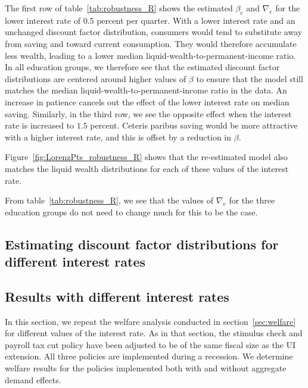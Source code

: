 \documentclass[\latexroot/\projectname]{subfiles}
\begin{document}
The first row of table~\ref{tab:robustness_R} shows the estimated $\beta_e$ and $\nabla_e$ for the lower interest rate of $0.5$ percent per quarter.
With a lower interest rate and an unchanged discount factor distribution, consumers would tend to substitute away from saving and toward current consumption.
They would therefore accumulate less wealth, leading to a lower median liquid-wealth-to-permanent-income ratio.
In all education groups, we therefore see that the estimated discount factor distributions are centered around higher values of $\beta$ to ensure that the model still matches the median liquid-wealth-to-permanent-income ratio in the data.
An increase in patience cancels out the effect of the lower interest rate on median saving.
Similarly, in the third row, we see the opposite effect when the interest rate is increased to $1.5$ percent.
Ceteris paribus saving would be more attractive with a higher interest rate, and this is offset by a reduction in $\beta$.

Figure~\ref{fig:LorenzPts_robustness_R} shows that the re-estimated model also matches the liquid wealth distributions for each of these values of the interest rate.



From table~\ref{tab:robustness_R}, we see that the values of $\nabla_e$ for the three education groups do not need to change much for this to be the case.

\subsection*{Estimating discount factor distributions for different interest rates}
\whenintegrated{\label{app:DF_R}} %

\subsection*{Results with different interest rates}
\whenintegrated{\label{sec:robust_R_results}} %

In this section, we repeat the welfare analysis conducted in section~\ref{sec:welfare} for different values of the interest rate.
As in that section, the stimulus check and payroll tax cut policy have been adjusted to be of the same fiscal size as the UI extension.
All three policies are implemented during a recession.
We determine welfare results for the policies implemented both with and without aggregate demand effects.
\end{document}
